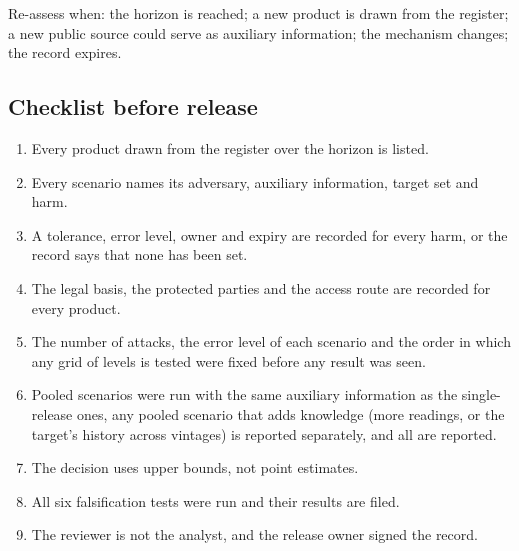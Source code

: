 \noindent Re-assess when: the horizon is reached; a new product is drawn from the
register; a new public source could serve as auxiliary information; the mechanism
changes; the record expires.

\subsection*{Checklist before release}

\begin{enumerate}
\item Every product drawn from the register over the horizon is listed.
\item Every scenario names its adversary, auxiliary information, target set and harm.
\item A tolerance, error level, owner and expiry are recorded for every harm, or the
record says that none has been set.
\item The legal basis, the protected parties and the access route are recorded
for every product.
\item The number of attacks, the error level of each scenario and the order in
which any grid of levels is tested were fixed before any result was seen.
\item Pooled scenarios were run with the same auxiliary information as the
single-release ones, any pooled scenario that adds knowledge (more readings, or
the target's history across vintages) is reported separately, and all are
reported.
\item The decision uses upper bounds, not point estimates.
\item All six falsification tests were run and their results are filed.
\item The reviewer is not the analyst, and the release owner signed the record.
\end{enumerate}
